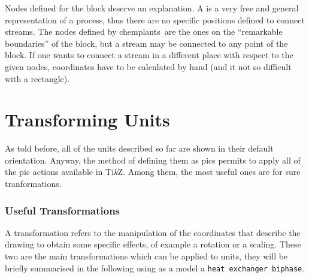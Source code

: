\documentclass[12pt]{article}						%
\newcommand*{\ac}[1]{%
		\textsmaller{#1}%
	}
\newcommand*{\chpp}[1]{\texttt{#1}}				%
\newcommand*{\chemplants}{chemplants}
\newcommand*{\TikZ}{Ti\textit{k}Z}
\begin{document}
Nodes defined for the block deserve an explanation. A \ac{BDF} is a very free
and general representation of a process, thus there are no specific positions
defined to connect streams. The nodes defined by \chemplants\ are the ones on the
``remarkable boundaries'' of the block, but a stream may be connected to any
point of the block. If one wants to connect a stream in a different place with
respect to the given nodes, coordinates have to be calculated by hand (and it not
so difficult with a rectangle).

\section{Transforming Units}

As told before, all of the units described so far are shown in their default
orientation. Anyway, the method of defining them as pics permits to apply all of
the pic actions available in \TikZ. Among them, the most useful ones are for
sure tranformations.

\subsubsection{Useful Transformations}

A transformation refers to the manipulation of the coordinates that describe the
drawing to obtain some specific effects, of example a rotation or a scaling.
These two are the main transformations which can be applied to units, they will
be briefly summarised in the following using as a model a
\chpp{heat exchanger biphase}.
\end{document}
